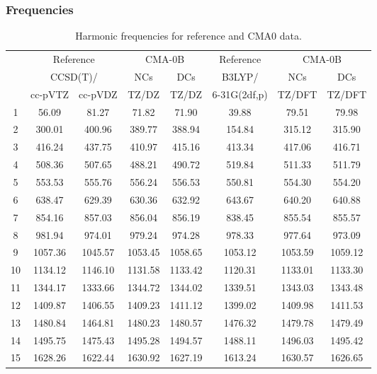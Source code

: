 \documentclass[10pt,oneside]{article}
\begin{document}
\subsubsection*{Frequencies}
\begin{table}[h!]
\centering
\caption{Harmonic frequencies for reference and CMA0 data.}
\begin{tabular}{cccccccc}
\toprule
{} & \multicolumn{2}{c}{Reference} & \multicolumn{2}{c}{CMA-0B} &    Reference & \multicolumn{2}{c}{CMA-0B} \\
{} & \multicolumn{2}{c}{CCSD(T)/} &     NCs &     DCs &       B3LYP/ &     NCs &     DCs \\
{} &   cc-pVTZ & cc-pVDZ &   TZ/DZ &   TZ/DZ & 6-31G(2df,p) &  TZ/DFT &  TZ/DFT \\
\midrule
1  &     56.09 &   81.27 &   71.82 &   71.90 &        39.88 &   79.51 &   79.98 \\
2  &    300.01 &  400.96 &  389.77 &  388.94 &       154.84 &  315.12 &  315.90 \\
3  &    416.24 &  437.75 &  410.97 &  415.16 &       413.34 &  417.06 &  416.71 \\
4  &    508.36 &  507.65 &  488.21 &  490.72 &       519.84 &  511.33 &  511.79 \\
5  &    553.53 &  555.76 &  556.24 &  556.53 &       550.81 &  554.30 &  554.20 \\
6  &    638.47 &  629.39 &  630.36 &  632.92 &       643.67 &  640.20 &  640.88 \\
7  &    854.16 &  857.03 &  856.04 &  856.19 &       838.45 &  855.54 &  855.57 \\
8  &    981.94 &  974.01 &  979.24 &  974.28 &       978.33 &  977.64 &  973.09 \\
9  &   1057.36 & 1045.57 & 1053.45 & 1058.65 &      1053.12 & 1053.59 & 1059.12 \\
10 &   1134.12 & 1146.10 & 1131.58 & 1133.42 &      1120.31 & 1133.01 & 1133.30 \\
11 &   1344.17 & 1333.66 & 1344.72 & 1344.02 &      1339.51 & 1343.03 & 1343.48 \\
12 &   1409.87 & 1406.55 & 1409.23 & 1411.12 &      1399.02 & 1409.98 & 1411.53 \\
13 &   1480.84 & 1464.81 & 1480.23 & 1480.57 &      1476.32 & 1479.78 & 1479.49 \\
14 &   1495.75 & 1475.43 & 1495.28 & 1494.57 &      1488.11 & 1496.03 & 1495.42 \\
15 &   1628.26 & 1622.44 & 1630.92 & 1627.19 &      1613.24 & 1630.57 & 1626.65 \\

\end{tabular}
\end{table}
\end{document}
